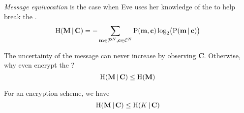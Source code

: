 \begin{definition}\label{def:Message_Equivocation}
  \emph{Message equivocation} is the case when Eve uses her knowledge of the  to help break the .
  \begin{equation}\label{eq:Message_Equivocation}
    \operatorname{\operatorname{H}}(\mathbf{M} \operatorname{\vert} \mathbf{C}) = - \sum\limits_{\mathbf{m} \in \operatorname{\mathcal{P}}^{N}, \mathbf{c} \in \operatorname{\mathcal{C}}^{N}} \operatorname{\operatorname{P}}(\mathbf{m}, \mathbf{c}) \log_{2} \bigl( \operatorname{\operatorname{P}}(\mathbf{m} \operatorname{\vert} \mathbf{c}) \bigr)
  \end{equation}

  \begin{remark}\label{def:Message_Equivocation_Upper_Bound}
    The uncertainty of the message can never increase by observing $\mathbf{C}$.
    Otherwise, why even encrypt the ?
    \begin{equation}\label{eq:Message_Equivocation_Upper_Bound}
      \operatorname{\operatorname{H}}(\mathbf{M} \operatorname{\vert} \mathbf{C}) \leq \operatorname{\operatorname{H}}(\mathbf{M})
    \end{equation}
  \end{remark}
\end{definition}

\begin{theorem}\label{thm:Message_Equivocation_Bounded_Key_Equivocation}
  For an encryption scheme, we have
  \begin{equation}\label{eq:Message_Equivocation_Bounded_Key_Equivocation}
    \operatorname{\operatorname{H}}(\mathbf{M} \operatorname{\vert} \mathbf{C}) \leq \operatorname{\operatorname{H}}(K \operatorname{\vert} \mathbf{C})
  \end{equation}
\end{theorem}

